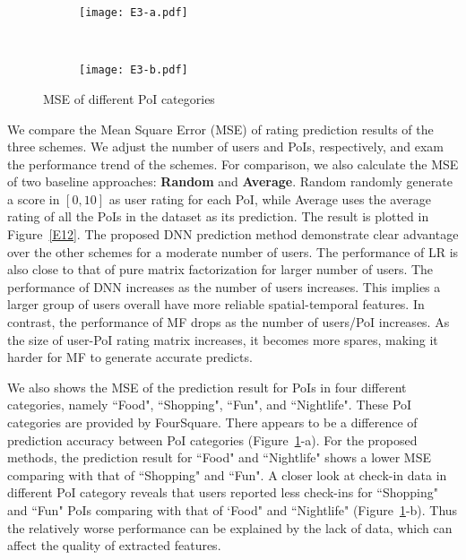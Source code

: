 \begin{figure}[htb]%
        \centering
        \begin{subfigure}{0.25\textwidth}
               \texttt{[image: E3-a.pdf]}
        \end{subfigure}%
        ~ %
        \begin{subfigure}{0.25\textwidth}
                \texttt{[image: E3-b.pdf]}
        \end{subfigure}
         \caption{MSE of different PoI categories}\label{E3}
         \vspace{-2mm}
\end{figure}

We compare the Mean Square Error (MSE) of rating prediction results of the three schemes. We adjust the number of users and PoIs, respectively, and exam the performance trend of the schemes. For comparison, we also calculate the MSE of two baseline approaches: \textbf{Random} and \textbf{Average}. Random randomly generate a score in $[0,10]$ as user rating for each PoI, while Average uses the average rating of all the PoIs in the dataset as its prediction. The result is plotted in Figure~\ref{E12}. The proposed DNN prediction method demonstrate clear advantage over the other schemes for a moderate number of users. The performance of LR is also close to that of pure matrix factorization for larger number of users. The performance of DNN increases as the number of users increases. This implies a larger group of users overall have more reliable spatial-temporal features. In contrast, the performance of MF drops as the number of users/PoI increases. As the size of user-PoI rating matrix increases, it becomes more spares, making it harder for MF to generate accurate predicts. 

We also shows the MSE of the prediction result for PoIs in four different categories, namely ``Food", ``Shopping", ``Fun", and ``Nightlife". These PoI categories are provided by FourSquare. There appears to be a difference of prediction accuracy between PoI categories (Figure~\ref{E3}-a). For the proposed methods, the prediction result for ``Food" and ``Nightlife" shows a lower MSE comparing with that of ``Shopping" and ``Fun". A closer look at check-in data in different PoI category reveals that users reported less check-ins for ``Shopping" and ``Fun" PoIs comparing with that of `Food" and ``Nightlife" (Figure~\ref{E3}-b). Thus the relatively worse performance can be explained by the lack of data, which can affect the quality of extracted features.


